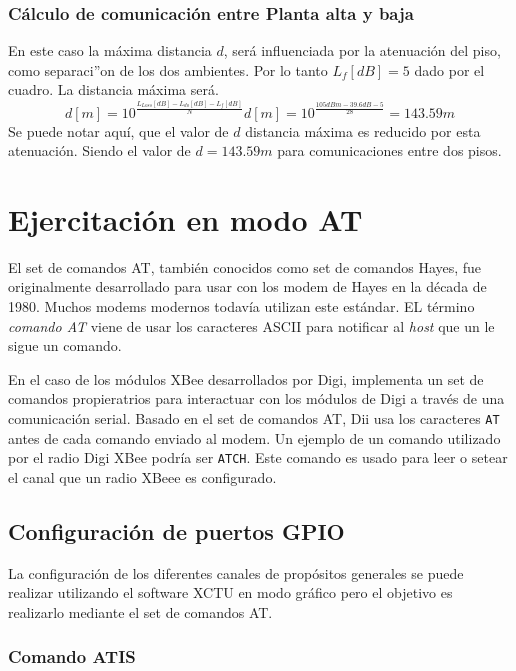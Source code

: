 \documentclass[11pt,oneside,spanish,a4paper]{article}
\begin{document}
\subsubsection{C\'alculo de comunicaci\'on entre Planta alta y baja}
En este caso la m\'axima distancia $d$, ser\'a influenciada por la atenuaci\'on del piso, como separaci''on de los dos ambientes. Por lo tanto $L_{f}[dB]=5$ dado por el cuadro. La distancia m\'axima ser\'a.
\begin{equation*}
\label{eq:calculod}
d[m] = 10 ^{\frac{L_{Loss}[dB] - L_{do}[dB] - L_{f}[dB]}{N}} 
d[m] = 10 ^{\frac{105dBm - 39.6dB - 5}{28}} = 143.59m
\end{equation*}
Se puede notar aqu\'i, que el valor de $d$ distancia m\'axima es
reducido por esta atenuaci\'on. Siendo el valor de $d=143.59m$ para
comunicaciones entre dos pisos.

\section{Ejercitación en modo AT}
\label{sec:AT}

El set de comandos AT, también conocidos como set de comandos Hayes,
fue originalmente desarrollado para usar con los modem de Hayes en la
década de 1980. Muchos modems modernos todavía utilizan este
estándar. EL término \emph{comando AT}  viene de usar los caracteres
ASCII para notificar al \textsl{host}  que un le sigue un comando. 

En el caso de los módulos XBee desarrollados por Digi, implementa un
set de comandos propieratrios para interactuar con los módulos de
Digi a través de una comunicación serial. Basado en el set de comandos
AT, Dii usa los caracteres \texttt{AT} antes de cada comando enviado
al modem. Un ejemplo de un comando utilizado por el radio Digi XBee
podría ser \texttt{ATCH}. Este comando es usado para leer o setear el
canal que un radio XBeee es configurado\cite{at-cmds}.

\subsection{Configuración de puertos GPIO}
\label{sec:config-at}

La configuración de los diferentes canales de propósitos generales se
puede realizar utilizando el software XCTU en modo gráfico pero el
objetivo es realizarlo mediante el set de comandos AT. 

\subsubsection{Comando ATIS}
\label{sec:atis}
\end{document}
